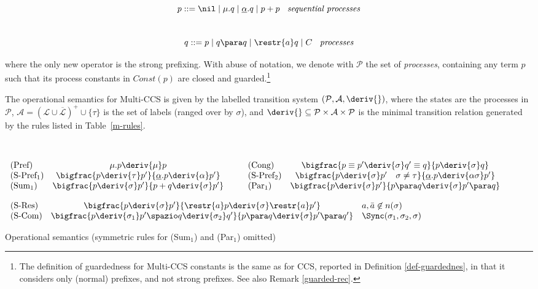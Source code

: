 \[p ::= \nil \mid \mu.q \mid  \underline{\alpha}.q \mid p+p \; \; \mbox{  {\em sequential processes}}\]\\[-.9cm]
\[q ::= p \mid q\para q \mid \restr{a}q \mid C  \; \; \mbox{  {\em processes}}\]

\noindent
where the only new operator is the strong prefixing.
With abuse of notation, we denote with ${\mathcal P}$ the set of {\em processes}, containing any term $p$
such that its process constants in $Const(p)$ are
closed  and guarded.\footnote{The definition of guardedness for Multi-CCS constants is the same as
for CCS, reported in Definition \ref{def-guardednes}, in that it considers only (normal) prefixes, and not strong prefixes.
See also Remark \ref{guarded-rec}.} 

The  operational semantics for Multi-CCS is given by the labelled 
transition system $({\mathcal P},{\mathcal A}, \deriv{ })$, where the states are the processes
in ${\mathcal P}$, ${\mathcal A} = (\mathcal{L} \cup \overline{\mathcal L})^+ \cup \{\tau\}$
is the set of labels (ranged over by $\sigma$),
and $\deriv{ } \subseteq {\mathcal P} \times{\mathcal A}\times{\mathcal P}$ is the minimal 
transition relation generated by the rules listed in Table~\ref{m-rules}. 


\begin{table}[t]
{\renewcommand{\arraystretch}{2.8}
\hrulefill\\[-.4cm]

\begin{center}
$\begin{array}{lcllcl}
\mbox{(Pref)}  & \mu.p\deriv{\mu}p & & \; \; \;
\mbox{(Cong)} & \bigfrac{p \equiv p' \deriv{\sigma}q' \equiv q}{p\deriv{\sigma}q} \\
\mbox{(S-Pref$_1$)}  & \bigfrac{p\deriv{\tau}p'}{\underline{\alpha}.p\deriv{\alpha}p'} & & \; \; \;
\mbox{(S-Pref$_2$)}  & \bigfrac{p\deriv{\sigma}p' \quad \sigma \neq \tau}{\underline{\alpha}.p\deriv{\alpha\sigma}p'} \\
\mbox{(Sum$_1$)}  & \bigfrac{p\deriv{\sigma}p'}{p+q\deriv{\sigma}p'}  & & \; \; \;
\mbox{(Par$_1$)}  & \bigfrac{p\deriv{\sigma}p'}{p\para q\deriv{\sigma}p'\para q} \\
\end{array}$

$\begin{array}{lcllcl}
\mbox{(S-Res)}  & \bigfrac{p\deriv{\sigma}p'}{\restr{a}p\deriv{\sigma}
\restr{a}p'} & a, \bar{a} \not\in n(\sigma) \\
\mbox{(S-Com)}  & \bigfrac{p\deriv{\sigma_1} p'\spazio q\deriv{\sigma_2}q'}{p
\para q \deriv{\sigma}p'\para q'} & \Sync(\sigma_1,  \sigma_2, \sigma) \\
\end{array}$

\hrulefill
\end{center}}
\caption{Operational semantics (symmetric rules for (Sum$_1$) and (Par$_1$) omitted)}\label{m-rules}
\end{table}


